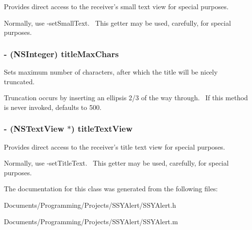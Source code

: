 Provides direct access to the receiver's small text view for special purposes. 

Normally, use -setSmallText.~ This getter may be used, carefully, for special purposes. \hypertarget{interface_s_s_y_alert_99e51047e4caf119c09dc51042afa504}{
\subsubsection[{titleMaxChars}]{\setlength{\rightskip}{0pt plus 5cm}- (NSInteger) titleMaxChars}}
\label{interface_s_s_y_alert_99e51047e4caf119c09dc51042afa504}


Sets maximum number of characters, after which the title will be nicely truncated. 

Truncation occurs by inserting an ellipsis 2/3 of the way through.~ If this method is never invoked, defaults to 500. \hypertarget{interface_s_s_y_alert_787999e7c2336835bccfccb6a956128e}{
\subsubsection[{titleTextView}]{\setlength{\rightskip}{0pt plus 5cm}- (NSTextView $\ast$) titleTextView}}
\label{interface_s_s_y_alert_787999e7c2336835bccfccb6a956128e}


Provides direct access to the receiver's title text view for special purposes. 

Normally, use -setTitleText.~ This getter may be used, carefully, for special purposes. 

The documentation for this class was generated from the following files:\begin{CompactItemize}
\item 
Documents/Programming/Projects/SSYAlert/SSYAlert.h\item 
Documents/Programming/Projects/SSYAlert/SSYAlert.m\end{CompactItemize}
